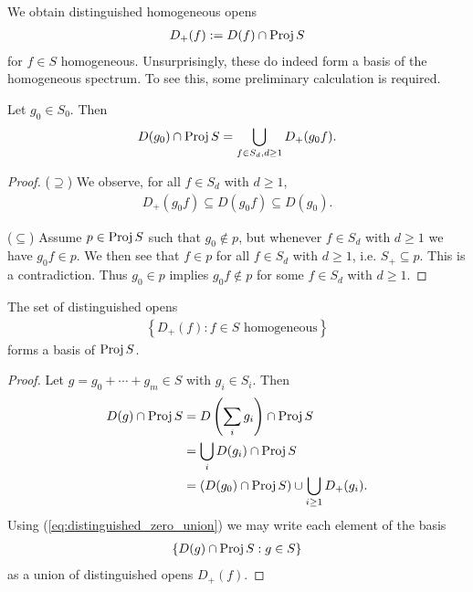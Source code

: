 \documentclass{article}
\begin{document}
We obtain distinguished homogeneous opens
\begin{align*}
  D_+(f) := D(f) \cap \operatorname{Proj} S
\end{align*}
for $f\in S$ homogeneous.
Unsurprisingly, these do indeed form a basis of the homogeneous spectrum.
To see this, some preliminary calculation is required.

\begin{lemma}
  Let $g_0\in S_0$. Then
  \begin{align}\label{eq:distinguished_zero_union}
    D(g_0) \cap \operatorname{Proj} S = \bigcup_{f\in S_d, d\geq 1} D_+(g_0f).
  \end{align}
  \begin{proof}
    ($\supseteq$) We observe, for all $f\in S_d$ with $d\geq 1$,
    \begin{align*}
      D_+(g_0f) \subseteq D(g_0 f) \subseteq D(g_0).
    \end{align*}

    ($\subseteq$) Assume $p\in\operatorname{Proj} S$ such that $g_0\not\in p$, but whenever
    $f\in S_d$ with $d\geq 1$ we have $g_0f\in p$. We then see that $f\in p$
    for all $f\in S_d$ with $d\geq 1$, i.e. $S_+\subseteq p$. This is a
    contradiction. Thus $g_0\in p$ implies $g_0 f\not\in p$
    for some $f\in S_d$ with $d\geq 1$.
  \end{proof}
\end{lemma}

\begin{proposition}
  The set of distinguished opens
  \begin{align*}
    \left\lbrace{ D_+(f) : \text{$f\in S$ homogeneous}}\right\rbrace
  \end{align*}
  forms a basis of $\operatorname{Proj} S$.
  \begin{proof}
    Let $g=g_0+\cdots+g_m\in S$ with $g_i\in S_i$. Then
    \begin{align*}
      D(g)\cap\operatorname{Proj} S
      &= D\left({\sum_i g_i}\right) \cap \operatorname{Proj} S \\
      &= \bigcup_i D(g_i) \cap\operatorname{Proj} S \\
      &= (D(g_0)\cap\operatorname{Proj} S)\cup \bigcup_{i\geq 1} D_+(g_i).
    \end{align*}
    Using (\ref{eq:distinguished_zero_union}) we may write each element
    of the basis
    \begin{align*}
      \left\lbrace{D(g) \cap \operatorname{Proj}S : g\in S}\right\rbrace
    \end{align*}
    as a union of distinguished opens $D_+(f)$.
  \end{proof}
\end{proposition}
\end{document}
